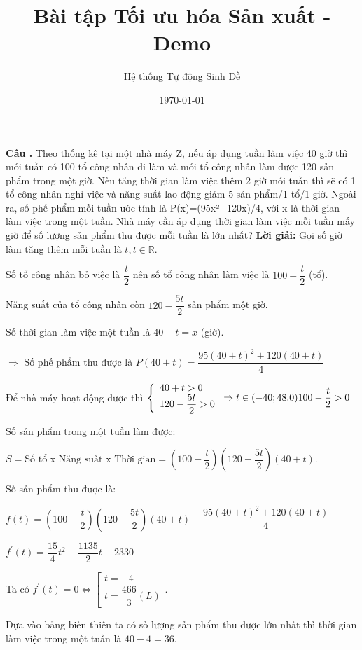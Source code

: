 \documentclass[12pt]{article}
\title{Bài tập Tối ưu hóa Sản xuất - Demo}
\author{Hệ thống Tự động Sinh Đề}
\date{\today}
\newcounter{ex}
\newenvironment{ex}{\refstepcounter{ex}\textbf{Câu \theex.} }{\vspace{0.5cm}}
\newcommand{\loigiai}[1]{\textbf{Lời giải:} #1}
\begin{document}
\maketitle


\begin{ex} Theo thống kê tại một nhà máy Z, nếu áp dụng tuần làm việc 40 giờ thì mỗi tuần có 100 tổ công nhân đi làm và mỗi tổ công nhân làm được 120 sản phẩm trong một giờ. Nếu tăng thời gian làm việc thêm 2 giờ mỗi tuần thì sẽ có 1 tổ công nhân nghỉ việc và năng suất lao động giảm 5 sản phẩm/1 tổ/1 giờ. Ngoài ra, số phế phẩm mỗi tuần ước tính là P(x)=(95x²+120x)/4, với x là thời gian làm việc trong một tuần. Nhà máy cần áp dụng thời gian làm việc mỗi tuần mấy giờ để số lượng sản phẩm thu được mỗi tuần là lớn nhất?
\loigiai{
	Gọi số giờ làm tăng thêm mỗi tuần là \(t, t \in \mathbb{R}\). 
	
	Số tổ công nhân bỏ việc là \(\dfrac{t}{2}\) nên số tổ công nhân làm việc là \(100-\dfrac{t}{2}\) (tổ). 
	
	Năng suất của tổ công nhân còn \(120-\dfrac{5 t}{2}\) sản phẩm một giờ. 
	
	Số thời gian làm việc một tuần là \(40+t=x\) (giờ).
	
	\(\Rightarrow\) Số phế phẩm thu được là \(P(40+t)=\dfrac{95(40+t)^2+120(40+t)}{4}\)
	
	Để nhà máy hoạt động được thì \(\left\{\begin{array}{l}40+t>0 \\ 120-\dfrac{5 t}{2}>0\end{array}\right. \Rightarrow t \in(-40 ; 48.0) \\
	100-\dfrac{t}{2}>0\)
	
	Số sản phẩm trong một tuần làm được: 
	
	\(S=\text{Số tổ x Năng suất x Thời gian}= \left(100-\dfrac{t}{2}\right)\left(120-\dfrac{5 t}{2}\right)(40+t)\). 
	
	Số sản phẩm thu được là:
	
	\(
	f(t)  =\left(100-\dfrac{t}{2}\right)\left(120-\dfrac{5 t}{2}\right)(40+t)-\dfrac{95(40+t)^2+120(40+t)}{4} \)
	
	\(f^{\prime}(t) = \dfrac{15}{4} t^2-\dfrac{1135}{2} t-2330\)
	
	Ta có \(f^{\prime}(t)=0 \Leftrightarrow\left[\begin{array}{l}t=-4 \\ t=\dfrac{466}{3}(L)\end{array}\right.\). 
	
	Dựa vào bảng biến thiên ta có số lượng sản phẩm thu được lớn nhất thì thời gian làm việc trong một tuần là \(40-4=36\).
	
}
\end{ex}
\end{document}
